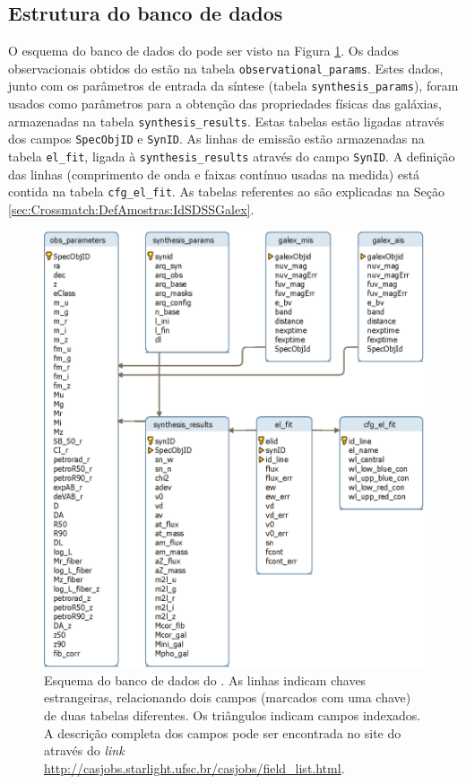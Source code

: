\subsection{Estrutura do banco de dados}
\label{sec:Crossmatch:EstruturaBDStarlight}

O esquema do banco de dados do \starlight pode ser visto na Figura
\ref{fig:EsquemaBDStarlight}. Os dados observacionais obtidos do \SDSS estão na
tabela \texttt{observational\_params}. Estes dados, junto com os parâmetros de
entrada da síntese (tabela \texttt{synthesis\_params}), foram usados como
parâmetros para a obtenção das propriedades físicas das galáxias, armazenadas na
tabela \texttt{synthesis\_results}. Estas tabelas estão ligadas através dos
campos \texttt{SpecObjID} e \texttt{SynID}. As linhas de emissão estão
armazenadas na tabela \texttt{el\_fit}, ligada à \texttt{synthesis\_results}
através do campo \texttt{SynID}. A definição das linhas (comprimento de onda e
faixas contínuo usadas na medida) está contida na tabela \texttt{cfg\_el\_fit}.
As tabelas referentes ao \galex são explicadas na Seção
\ref{sec:Crossmatch:DefAmostras:IdSDSSGalex}.

\begin{figure}
	\includegraphics{figuras/starlight-schema.eps}
	\caption[Esquema do banco de dados do \starlight.]
	{Esquema do banco de dados do \starlight. As linhas indicam chaves
	estrangeiras, relacionando dois campos (marcados com uma chave) de duas tabelas
	diferentes. Os triângulos indicam campos indexados. A descrição completa dos
	campos pode ser encontrada no site do \starlight através do {\em link}
	\url{http://casjobs.starlight.ufsc.br/casjobs/field_list.html}.}
	\label{fig:EsquemaBDStarlight}
\end{figure}

